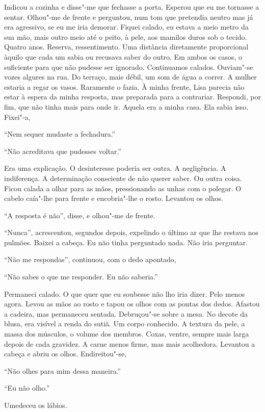 Indicou a cozinha e disse"-me que fechasse a porta. Esperou que eu me
tornasse a sentar. Olhou"-me de frente e perguntou, num tom que
pretendia neutro mas já era agressivo, se eu me iria demorar. Fiquei
calado, eu estava a meio metro da sua mão, mais outro meio até o peito,
à pele, aos mamilos duros sob o tecido. Quatro anos. Reserva,
ressentimento. Uma distância diretamente proporcional àquilo que cada
um sabia ou recusava saber do outro. Em ambos os casos, o suficiente
para que não pudesse ser ignorado. Continuamos calados. Ouviam"-se vozes
algures na rua. Do terraço, mais débil, um som de água a correr. A
mulher estaria a regar os vasos. Raramente o fazia. À minha frente, Lisa
parecia não estar à espera da minha resposta, mas preparada para a
contrariar. Respondi, por fim, que não tinha mais para onde ir. Aquela
era a minha casa. Ela sabia isso. Fixei"-a,

``Nem sequer mudaste a fechadura.''

``Não acreditava que pudesses voltar.''

Era uma explicação. O desinteresse poderia ser outra. A negligência. A
indiferença. A determinação consciente de não querer saber. Ou outra
coisa. Ficou calada a olhar para as mãos, pressionando as unhas com o
polegar. O cabelo caía"-lhe para frente e encobria"-lhe o rosto.
Levantou os olhos.

``A resposta é não'',
disse, e olhou"-me de frente.

``Nunca'',
acrescentou, segundos depois, expelindo o último ar que lhe restava nos
pulmões. Baixei a cabeça. Eu não tinha perguntado nada. Não iria
perguntar.

``Não me respondas'',
continuou, com o dedo apontado,

``Não sabes o que me responder. Eu não saberia.''

Permaneci calado. O que quer que eu soubesse não lho iria dizer. Pelo
menos agora. Levou as mãos ao rosto e tapou os olhos com as pontas dos
dedos. Afastou a cadeira, mas permaneceu sentada. Debruçou"-se sobre a
mesa. No decote da blusa, era visível a renda do sutiã. Um corpo
conhecido. A textura da pele, a massa dos músculos, o volume dos
membros. Coxas, ventre, sempre mais larga depois de cada gravidez. A
carne menos firme, mas mais acolhedora. Levantou a cabeça e abriu os
olhos. Endireitou"-se,

``Não olhes para mim dessa maneira.''

``Eu não olho.''

Umedeceu os lábios.

